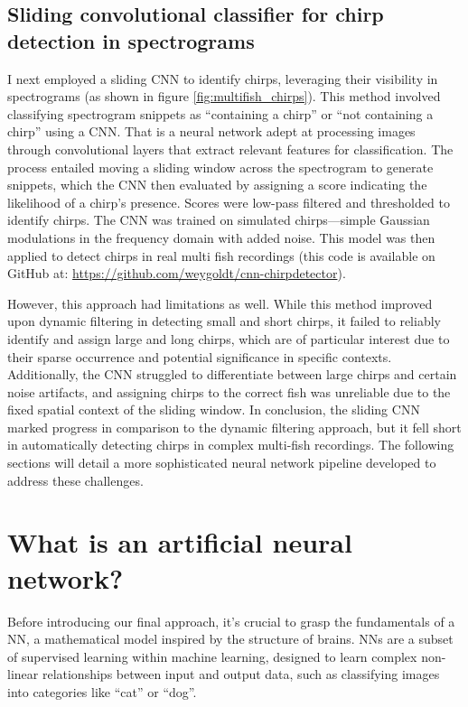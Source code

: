\subsection{Sliding convolutional classifier for chirp detection in spectrograms}
\label{sec:cnndetector}

I next employed a sliding \acrfull{CNN} to identify chirps, leveraging their
visibility in spectrograms (as shown in figure \ref{fig:multifish_chirps}).
This method involved classifying spectrogram snippets as \enquote{containing a
chirp} or \enquote{not containing a chirp} using a CNN. That is a neural
network adept at processing images through convolutional layers that extract
relevant features for classification. The process entailed moving a sliding
window across the spectrogram to generate snippets, which the CNN then
evaluated by assigning a score indicating the likelihood of a chirp's presence.
Scores were low-pass filtered and thresholded to identify chirps. The CNN was
trained on simulated chirps—simple Gaussian modulations in the frequency domain
with added noise. This model was then applied to detect chirps in real
multi fish recordings (this code is available on GitHub at:
\url{https://github.com/weygoldt/cnn-chirpdetector}).

However, this approach had limitations as well. While this method improved upon
dynamic filtering in detecting small and short chirps, it failed to reliably
identify and assign large and long chirps, which are of particular interest due
to their sparse occurrence and potential significance in specific contexts.
Additionally, the CNN struggled to differentiate between large chirps and
certain noise artifacts, and assigning chirps to the correct fish was
unreliable due to the fixed spatial context of the sliding window. In
conclusion, the sliding CNN marked progress in comparison to the dynamic
filtering approach, but it fell short in automatically detecting chirps in
complex multi-fish recordings. The following sections will detail a more
sophisticated neural network pipeline developed to address these challenges.

\vfill

\section{What is an artificial neural network?}
\label{sec:nns}

Before introducing our final approach, it's crucial to grasp the fundamentals
of a \acrfull{NN}, a mathematical model inspired by the structure of brains.
NNs are a subset of supervised learning within machine learning, designed to
learn complex non-linear relationships between input and output data, such as
classifying images into categories like \enquote{cat} or \enquote{dog}.

